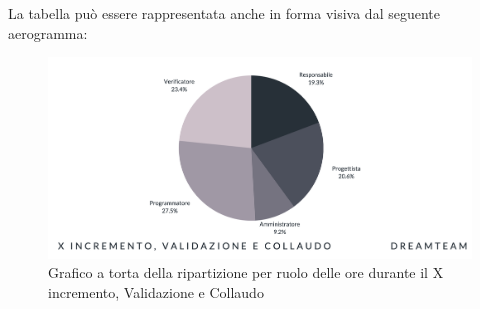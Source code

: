 La tabella può essere rappresentata anche in forma visiva dal seguente aerogramma:
\begin{figure}[H]
\centering
\includegraphics[scale=0.50]{Sezioni/SezioniPreventivo/grafici/validazione/Validazione_X_incremento_costi.png}
\caption{Grafico a torta della ripartizione per ruolo delle ore durante il X incremento, Validazione e Collaudo}
\end{figure}

\pagebreak

